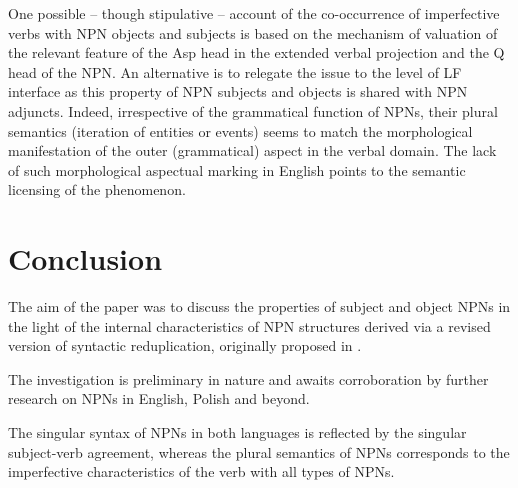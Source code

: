\documentclass[output=paper]{langscibook}
\begin{document}
\ea \label{psk:ex:key:24} 
\z
\z

\noindent One possible – though stipulative – account of the co-occurrence of imperfective verbs with NPN objects and subjects is based on the mechanism of valuation of the relevant feature of the Asp head in the extended verbal projection and the Q head of the NPN. An alternative is to relegate the issue to the level of LF interface as this property of NPN subjects and objects is shared with NPN adjuncts. Indeed, irrespective of the grammatical function of NPNs, their plural semantics (iteration of entities or events) seems to match the morphological manifestation of the outer (grammatical) aspect in the verbal domain. The lack of such morphological aspectual marking in English points to the semantic licensing of the phenomenon.

\section{Conclusion}\label{psk:sec:sec4}

The aim of the paper was to discuss the properties of subject and object NPNs in the light of the internal characteristics of NPN structures derived via a revised version of syntactic reduplication, originally proposed in \citet{Travis2001,Travis2003}.

The investigation is preliminary in nature and awaits corroboration by further research on NPNs in English, Polish and beyond.

The singular syntax of NPNs in both languages is reflected by the singular subject-verb agreement, whereas the plural semantics of NPNs corresponds to the imperfective characteristics of the verb with all types of NPNs.
\end{document}
